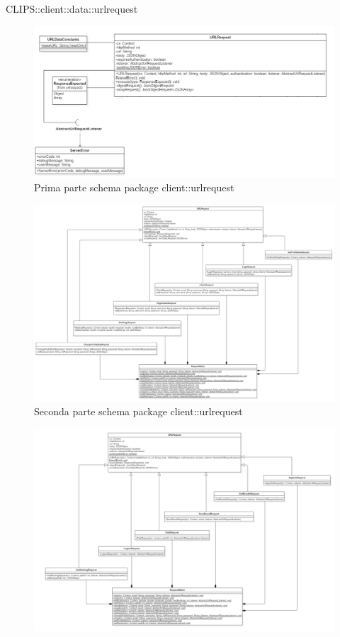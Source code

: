 \begin{componente}{CLIPS::client::data::urlrequest}
\begin{figure}[h!]
\centering
\includegraphics[scale=0.4]{img/package/png/client--urlrequest1.png}
\caption{Prima parte schema package client::urlrequest}
 \end{figure}
 \begin{figure}[h!]
 	\centering
 	\includegraphics[scale=0.3]{img/package/png/client--urlrequest2.png}
 	\caption{Seconda parte schema package client::urlrequest}
 \end{figure}
 \begin{figure}[h!]
 	\centering
 	\includegraphics[scale=0.3]{img/package/png/client--urlrequest3.png}

\end{figure}
\end{componente}
